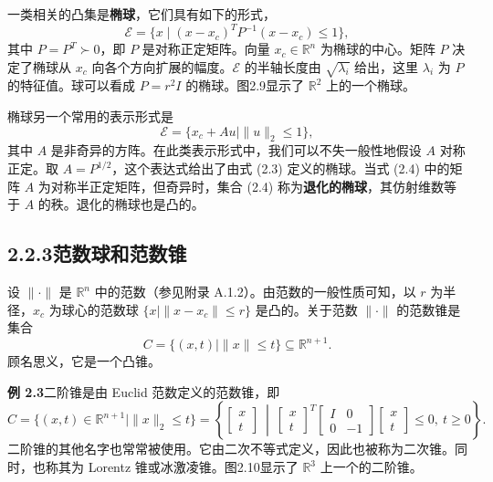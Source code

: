 \documentclass[UTF8, 12pt, fontset=fandol, oneside]{ctexart}
\begin{document}
一类相关的凸集是\textbf{椭球}，它们具有如下的形式，
\begin{equation}
  \mathcal{E}=\{x\mid (x-x_c)^TP^{-1}(x-x_c)\le 1\},
  \tag{2.3}
\end{equation}
其中 $P=P^T\succ 0$，即 $P$ 是对称正定矩阵。向量 $x_c\in\mathbb{R}^n$ 为椭球的中心。矩阵 $P$ 决定了椭球从 $x_c$ 向各个方向扩展的幅度。$\mathcal{E}$ 的半轴长度由 $\sqrt{\lambda_i}$ 给出，这里 $\lambda_i$ 为 $P$ 的特征值。球可以看成 $P=r^2I$ 的椭球。图2.9显示了 $\mathbb{R}^2$ 上的一个椭球。

椭球另一个常用的表示形式是
\begin{equation}
  \mathcal{E}=\{x_c+Au\mid \|u\|_2\le 1\},
  \tag{2.4}
\end{equation}
其中 $A$ 是非奇异的方阵。在此类表示形式中，我们可以不失一般性地假设 $A$ 对称正定。取 $A=P^{1/2}$，这个表达式给出了由式 (2.3) 定义的椭球。当式 (2.4) 中的矩阵 $A$ 为对称半正定矩阵，但奇异时，集合 (2.4) 称为\textbf{退化的椭球}，其仿射维数等于 $A$ 的秩。退化的椭球也是凸的。

\subsection*{2.2.3\quad 范数球和范数锥}

设 $\|\cdot\|$ 是 $\mathbb{R}^n$ 中的范数（参见附录 A.1.2）。由范数的一般性质可知，以 $r$ 为半径，$x_c$ 为球心的范数球 $\{x\mid \|x-x_c\|\le r\}$ 是凸的。关于范数 $\|\cdot\|$ 的范数锥是集合
\[
  C=\{(x,t)\mid \|x\|\le t\}\subseteq\mathbb{R}^{n+1}.
\]
顾名思义，它是一个凸锥。

\noindent\textbf{例 2.3}\quad 二阶锥是由 Euclid 范数定义的范数锥，即
\[
  C=\{(x,t)\in\mathbb{R}^{n+1}\mid \|x\|_2\le t\}
  =
  \left\{
  \begin{bmatrix} x\\ t \end{bmatrix}
  \ \middle|\
  \begin{bmatrix} x\\ t \end{bmatrix}^{T}
  \begin{bmatrix} I & 0\\ 0 & -1 \end{bmatrix}
  \begin{bmatrix} x\\ t \end{bmatrix}
  \le 0,\ t\ge 0
  \right\}.
\]
二阶锥的其他名字也常常被使用。它由二次不等式定义，因此也被称为二次锥。同时，也称其为 Lorentz 锥或冰激凌锥。图2.10显示了 $\mathbb{R}^3$ 上一个的二阶锥。
\end{document}
